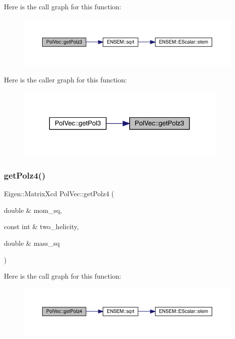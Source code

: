 Here is the call graph for this function\+:
\nopagebreak
\begin{figure}[H]
\begin{center}
\leavevmode
\includegraphics[width=350pt]{d7/d0c/namespacePolVec_a8671b890f81a976ae4f806cf53ae61df_cgraph}
\end{center}
\end{figure}
Here is the caller graph for this function\+:\nopagebreak
\begin{figure}[H]
\begin{center}
\leavevmode
\includegraphics[width=294pt]{d7/d0c/namespacePolVec_a8671b890f81a976ae4f806cf53ae61df_icgraph}
\end{center}
\end{figure}
\mbox{\label{namespacePolVec_a51d6ba884df8fd4c9466477aae902ec7}} 
\subsubsection{\texorpdfstring{getPolz4()}{getPolz4()}}
{\footnotesize\ttfamily Eigen\+::\+Matrix\+Xcd Pol\+Vec\+::get\+Polz4 (\begin{DoxyParamCaption}\item[{double \&}]{mom\+\_\+sq,  }\item[{const int \&}]{two\+\_\+helicity,  }\item[{double \&}]{mass\+\_\+sq }\end{DoxyParamCaption})}

Here is the call graph for this function\+:
\nopagebreak
\begin{figure}[H]
\begin{center}
\leavevmode
\includegraphics[width=350pt]{d7/d0c/namespacePolVec_a51d6ba884df8fd4c9466477aae902ec7_cgraph}
\end{center}
\end{figure}
